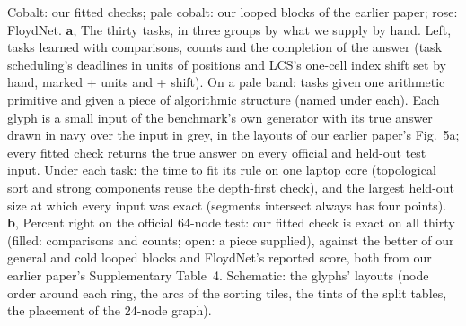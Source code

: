  Cobalt: our fitted checks; pale cobalt: our looped blocks of the
earlier paper; rose: FloydNet. \textbf{a}, The thirty tasks, in three groups by what we supply by hand. Left,
 tasks learned with comparisons, counts and the completion of the answer (task scheduling's deadlines in units
of positions and LCS's one-cell index shift set by hand, marked + units and + shift). On a pale band:
 tasks given one arithmetic primitive and  given a piece of algorithmic structure (named
under each). Each glyph is a small input of the benchmark's own generator with its true answer drawn in navy over the
input in grey, in the layouts of our earlier paper's Fig.~5a; every fitted check returns the true answer on every
official and held-out test input. Under each task: the time to fit its rule on one laptop core (topological
sort and strong components reuse the depth-first check), and the largest held-out
size at which every input was exact (segments intersect always has four points). \textbf{b}, Percent right on the
official 64-node test: our fitted check is exact on all thirty (filled: comparisons and counts; open: a piece supplied), against the
better of our general and cold looped blocks and FloydNet's reported score, both from our earlier paper's
Supplementary Table~4. Schematic: the glyphs' layouts (node order around each ring, the arcs of the sorting tiles, the
tints of the split tables, the placement of the 24-node graph).
